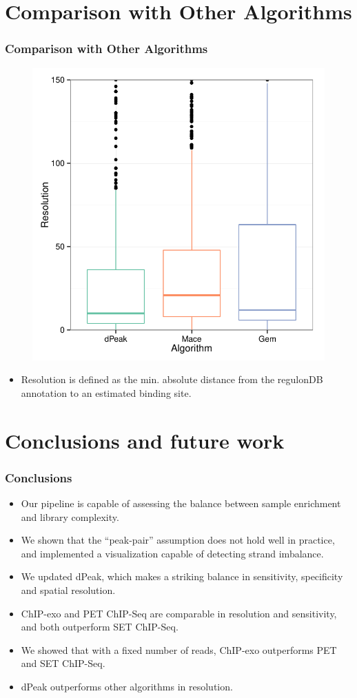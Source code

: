 \documentclass[compress,table,xcolor=dvipsnames]{beamer}\usepackage[]{graphicx}\usepackage[]{color}
\begin{document}
\section{Comparison with Other Algorithms}
\begin{frame}
\frametitle{Comparison with Other Algorithms}

\begin{figure}[H]
  \centering
  \includegraphics[width = .6\textwidth]{../figs/for_paper/algorithm_resolution.pdf}
\end{figure}
  
{\scriptsize
  \begin{itemize}
  \item Resolution is defined as the min. absolute distance from the
    regulonDB annotation to an estimated binding site.
  \end{itemize}
}

\end{frame}

\section{Conclusions and future work}

\begin{frame}
  \frametitle{Conclusions}

  \begin{itemize}
  \item Our pipeline is capable of assessing the balance between
    sample enrichment and library complexity.
  \item We shown that the ``peak-pair'' assumption does not hold well
    in practice, and implemented a visualization capable of detecting
    strand imbalance.
  \item We updated dPeak, which makes a striking balance in
    sensitivity, specificity and spatial resolution.
  \item ChIP-exo and PET ChIP-Seq are comparable in resolution and
    sensitivity, and both outperform SET ChIP-Seq.
  \item We showed that with a fixed number of reads, ChIP-exo
    outperforms PET and SET ChIP-Seq.
  \item dPeak outperforms other algorithms in resolution.
  \end{itemize}
\end{frame}
\end{document}
